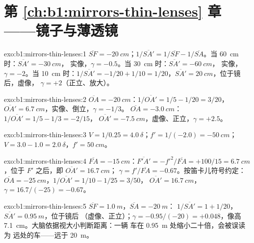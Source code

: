 \section*{第 \ref{ch:b1:mirrors-thin-lenses} 章——镜子与薄透镜}

\begin{solution}{exo:b1:mirrors-thin-lenses:1}
$\overline{SF} = \qty{-20}{cm}$；$1/\overline{SA'} = 1/\overline{SF} -
1/\overline{SA}$。当 \qty{60}{cm} 时：$\overline{SA'} = \qty{-30}{cm}$，
实像，$\gamma = -0.5$。当 \qty{30}{cm} 时：$\overline{SA'} = \qty{-60}{cm}$，
实像，$\gamma = -2$。当 \qty{10}{cm} 时：$1/\overline{SA'} = -1/20 + 1/10
= 1/20$，$\overline{SA'} = \qty{+20}{cm}$，位于镜后，虚像，
$\gamma = +2$（正立、放大）。
\end{solution}

\begin{solution}{exo:b1:mirrors-thin-lenses:2}
$\overline{OA} = \qty{-20}{cm}$：$1/\overline{OA'} = 1/5 - 1/20 = 3/20$，
$\overline{OA'} = \qty{+6.7}{cm}$，实像、倒立，$\gamma = -1/3$。
$\overline{OA} = \qty{-3.0}{cm}$：$1/\overline{OA'} = 1/5 - 1/3 = -2/15$，
$\overline{OA'} = \qty{-7.5}{cm}$，虚像、正立，$\gamma = +2.5$。
\end{solution}

\begin{solution}{exo:b1:mirrors-thin-lenses:3}
$V = 1/0.25 = \qty{+4.0}{\delta}$；$f' = 1/(-2.0) = \qty{-50}{cm}$；
$V = 3.0 - 1.0 = \qty{+2.0}{\delta}$，$f' = \qty{50}{cm}$。
\end{solution}

\begin{solution}{exo:b1:mirrors-thin-lenses:4}
$\overline{FA} = \qty{-15}{cm}$：$\overline{F'A'} = -f'^2/\overline{FA}
= +100/15 = \qty{6.7}{cm}$，位于 $F'$ 之后，即 $\overline{OA'} = \qty{16.7}{cm}$；
$\gamma = f'/\overline{FA} = -0.67$。按笛卡儿符号约定：$\overline{OA} =
\qty{-25}{cm}$，$1/\overline{OA'} = 1/10 - 1/25 = 3/50$，
$\overline{OA'} = \qty{16.7}{cm}$，$\gamma = 16.7/(-25) = -0.67$。
\end{solution}

\begin{solution}{exo:b1:mirrors-thin-lenses:5}
$\overline{SF} = \qty{+1.0}{m}$，$\overline{SA} = \qty{-20}{m}$：
$1/\overline{SA'} = 1 + 1/20$，$\overline{SA'} = \qty{0.95}{m}$，位于镜后
（虚像、正立）；$\gamma = -0.95/(-20) = +0.048$，像高
\qty{7.1}{cm}。大脑依据视大小判断距离：一辆
车在 \qty{0.95}{m} 处缩小二十倍，会被误读为
远处的车——远于 \qty{20}{m}。
\end{solution}

